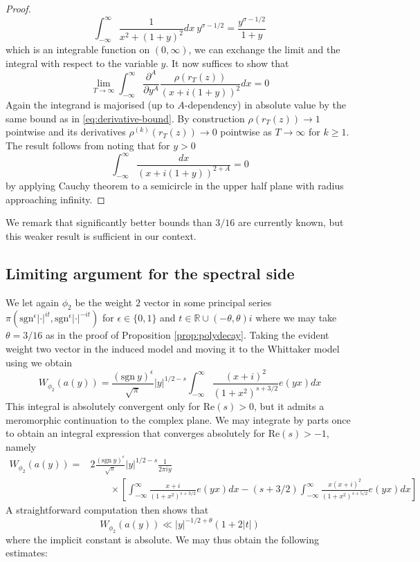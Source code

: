 \documentclass{article}
\numberwithin{equation}{section}
\begin{document}
\begin{proof}
    $$\int_{-\infty}^{\infty}\frac{1}{x^2+(1+y)^2}dx\ y^{\sigma-1/2}=\frac{y^{\sigma-1/2}}{1+y}$$
    which is an integrable function on $(0,\infty)$, we can exchange the limit and the integral with respect to the variable $y$. It now suffices to show that
    $$\lim_{T\to \infty}\int_{-\infty}^{\infty}\frac{\partial ^A}{\partial y^A}\frac{\rho(r_T(z))}{(x+i(1+y))^2}dx=0$$
    Again the integrand is majorised (up to $A$-dependency) in absolute value by the same bound as in \eqref{eq:derivative-bound}.
    By construction $\rho(r_T(z))\to1$ pointwise and its derivatives $\rho^{(k)}(r_T(z))\to 0$ pointwise as $T\to \infty$ for $k \geq 1$. The result follows from noting that for $y > 0$
    $$\int_{-\infty}^{\infty}\frac{dx}{(x+i(1+y))^{2+A}}=0$$
    by applying Cauchy theorem to a semicircle in the upper half plane with radius approaching infinity.
\end{proof}
We remark that significantly better bounds than $3/16$ are currently known, but this weaker result is sufficient in our context. 

\subsection{Limiting argument for the spectral side}
We let again $\phi_2$ be the weight $2$ vector in some principal series $\pi(\text{sgn}^\epsilon|\cdot|^{it},\text{sgn}^\epsilon|\cdot|^{-it})$ for $\epsilon \in\{0,1\}$ and $t \in \mathbb{R}\cup(-\theta,\theta)i$ where we may take $\theta=3/16$ as in the proof of Proposition \ref{prop:polydecay}. Taking the evident weight two vector in the induced model and moving it to the Whittaker model using \cite[(3.10)]{Michel_2010} we obtain
\begin{equation}
    W_{\phi_2}(a(y))=\frac{(\text{sgn} \ y)^\epsilon}{\sqrt{\pi}}|y|^{1/2-s}\int_{-\infty}^{\infty}\frac{(x+i)^2}{(1+x^2)^{s+3/2}}e(yx)dx
\end{equation}
This integral is absolutely convergent only for $\text{Re}(s)>0$, but it admits a meromorphic continuation to the complex plane. We may integrate by parts once to obtain an integral expression that converges absolutely for $\text{Re}(s)>-1$, namely
\begin{align*}
    W_{\phi_2}(a(y))=& 2\frac{(\text{sgn} \ y)^\epsilon}{\sqrt{\pi}}|y|^{1/2-s}\frac{1}{2\pi i y} \\ & \qquad \times \left[\int_{-\infty}^{\infty}\frac{x+i}{(1+x^2)^{s+3/2}}e(yx)dx  
     -(s+3/2)\int_{-\infty}^{\infty}\frac{x(x+i)^2}{(1+x^2)^{s+5/2}}e(yx)dx \right]
\end{align*}
A straightforward computation then shows that
\begin{equation}\label{eq:whittaker-bound}
    W_{\phi_2}(a(y))\ll |y|^{-1/2+\theta}(1+2|t|)
\end{equation}
where the implicit constant is absolute. We may thus obtain the following estimates:
\end{document}
